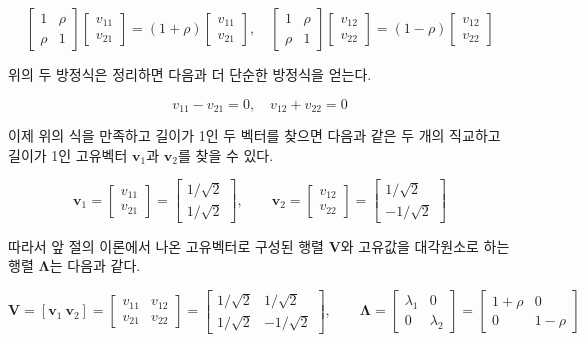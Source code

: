 \documentclass[
]{book}
\begin{document}
\[ 
\begin{bmatrix}
1  &  \rho \\
\rho & 1 
\end{bmatrix}
\begin{bmatrix} 
 v_{11} \\
 v_{21}
\end{bmatrix}
=
(1+ \rho)
\begin{bmatrix} 
 v_{11} \\
 v_{21}
\end{bmatrix}
, \quad 
\begin{bmatrix}
1  &  \rho \\
\rho & 1 
\end{bmatrix}
\begin{bmatrix} 
 v_{12} \\
 v_{22}
\end{bmatrix}
=
(1- \rho)
\begin{bmatrix} 
 v_{12} \\
 v_{22}
\end{bmatrix}
\]

위의 두 방정식은 정리하면 다음과 더 단순한 방정식을 얻는다.

\[  v_{11} -  v_{21} = 0, \quad  v_{12}+ v_{22}=0 \]

이제 위의 식을 만족하고 길이가 1인 두 벡터를 찾으면 다음과 같은 두 개의 직교하고 길이가 1인 고유벡터 \(\bm v_1\)과 \(\bm v_2\)를 찾을 수 있다.

\[ 
\bm v_1 = 
\begin{bmatrix} 
 v_{11} \\
 v_{21}
\end{bmatrix}
= 
\begin{bmatrix} 
1/\sqrt{2} \\
1/\sqrt{2}
\end{bmatrix},
\quad \quad
\bm v_2 = 
\begin{bmatrix} 
 v_{12} \\
 v_{22}
\end{bmatrix}
= 
\begin{bmatrix} 
1/\sqrt{2} \\
-1/\sqrt{2}
\end{bmatrix}
\]

따라서 앞 절의 이론에서 나온 고유벡터로 구성된 행렬 \(\bm V\)와 고유값을 대각원소로 하는 행렬 \(\bm \Lambda\)는 다음과 같다.

\[ 
\bm V = [\bm v_1~ \bm v_2]
= \begin{bmatrix} 
 v_{11} &  v_{12}\\
 v_{21} &  v_{22}
\end{bmatrix}
= 
\begin{bmatrix} 
1/\sqrt{2} &  1/\sqrt{2}\\
1/\sqrt{2} &  -1/\sqrt{2}
\end{bmatrix},
\quad \quad
\bm \Lambda =
 \begin{bmatrix} 
\lambda_1 & 0 \\
0 & \lambda_2
\end{bmatrix}
= 
 \begin{bmatrix} 
1+\rho & 0 \\
0 & 1-\rho
\end{bmatrix}
\]
\end{document}

